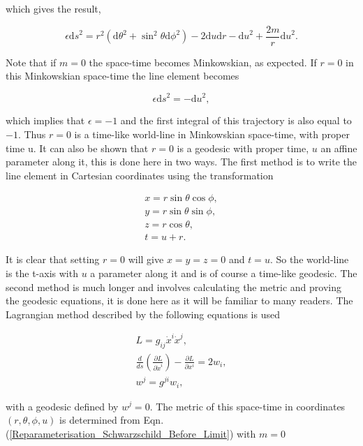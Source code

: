 \noindent which gives the result,

\begin{equation}\label{Reparameterisation_Schwarzschild_Before_Limit}
\epsilon {\mathrm{d}s}^{2} = r^2 ({\mathrm{d}\theta}^2 + {{\sin}^2 \theta}{\mathrm{d} \phi}^2) - 2 \mathrm{d}u \mathrm{d}r - {\mathrm{d}u}^{2} + \frac{2m}{r} {\mathrm{d}u}^{2}. 
\end{equation}

Note that if $m = 0$ the space-time becomes Minkowskian, as expected. If $r = 0$ in this Minkowskian space-time the line element becomes

$$ \epsilon {\mathrm{d}s}^2 = - {\mathrm{d}u}^{2},$$

\noindent which implies that $\epsilon = -1$ and the first integral of this trajectory is also equal to $-1$. Thus $r = 0$ is a time-like world-line in Minkowskian space-time, with proper time u. It can also be shown that $r=0$ is a geodesic with proper time, $u$ an affine parameter along it, this is done here in two ways. The first method is to write the line element in Cartesian coordinates using the transformation

\begin{gather*} 
x = r\sin{\theta}\cos{\phi}, \\
y = r\sin{\theta}\sin{\phi}, \\
z = r\cos{\theta}, \\
t = u + r.
\end{gather*}

\noindent It is clear that setting $r=0$ will give $x = y = z = 0$ and $t = u$. So the world-line is the t-axis with $u$ a parameter along it and is of course a time-like geodesic. The second method is much longer and involves calculating the metric and proving the geodesic equations, it is done here as it will be familiar to many readers. The Lagrangian method described by the following equations is used

\begin{gather*}
L = g_{ij} \dot{x}^{i}\dot{x}^{j},\\
\frac{d}{ds}\left( \frac{\partial L}{\partial \dot{x}^{i}}\right) - \frac{\partial L}{\partial {x}^{i}} = 2 w_{i}, \\
w^{j} = g^{ji}w_{i},  
\end{gather*}

\noindent with a geodesic defined by $w^{j} = 0$. The metric of this space-time in coordinates $(r ,\theta, \phi, u)$ is determined from Eqn.(\ref{Reparameterisation_Schwarzschild_Before_Limit}) with $m=0$

